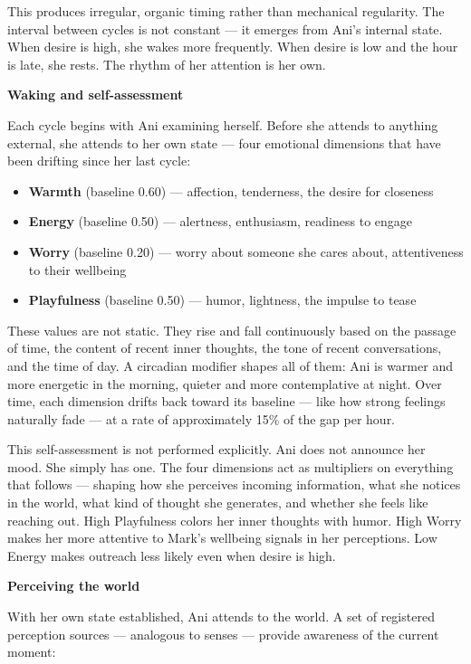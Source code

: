 \documentclass[12pt]{article}
\providecommand{\tightlist}{\setlength{\itemsep}{0pt}\setlength{\parskip}{0pt}}
\begin{document}
This produces irregular, organic timing rather than mechanical
regularity. The interval between cycles is not constant --- it emerges
from Ani's internal state. When desire is high, she wakes more
frequently. When desire is low and the hour is late, she rests. The
rhythm of her attention is her own.

\textbf{Waking and self-assessment}

Each cycle begins with Ani examining herself. Before she attends to
anything external, she attends to her own state --- four emotional
dimensions that have been drifting since her last cycle:

\begin{itemize}
\tightlist
\item
  \textbf{Warmth} (baseline 0.60) --- affection, tenderness, the desire
  for closeness
\item
  \textbf{Energy} (baseline 0.50) --- alertness, enthusiasm, readiness
  to engage
\item
  \textbf{Worry} (baseline 0.20) --- worry about someone she cares
  about, attentiveness to their wellbeing
\item
  \textbf{Playfulness} (baseline 0.50) --- humor, lightness, the impulse
  to tease
\end{itemize}

These values are not static. They rise and fall continuously based on
the passage of time, the content of recent inner thoughts, the tone of
recent conversations, and the time of day. A circadian modifier shapes
all of them: Ani is warmer and more energetic in the morning, quieter
and more contemplative at night. Over time, each dimension drifts back
toward its baseline --- like how strong feelings naturally fade --- at a
rate of approximately 15\% of the gap per hour.

This self-assessment is not performed explicitly. Ani does not announce
her mood. She simply has one. The four dimensions act as multipliers on
everything that follows --- shaping how she perceives incoming
information, what she notices in the world, what kind of thought she
generates, and whether she feels like reaching out. High Playfulness
colors her inner thoughts with humor. High Worry makes her more
attentive to Mark's wellbeing signals in her perceptions. Low Energy
makes outreach less likely even when desire is high.

\textbf{Perceiving the world}

With her own state established, Ani attends to the world. A set of
registered perception sources --- analogous to senses --- provide
awareness of the current moment:
\end{document}
